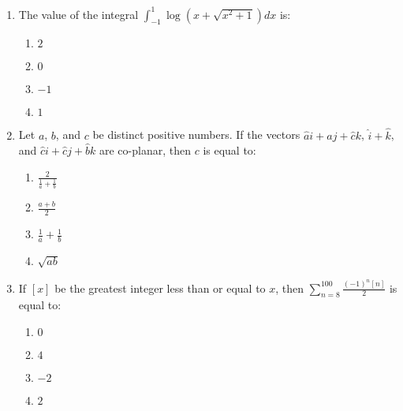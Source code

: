 \documentclass[journal]{IEEEtran}
\newcommand{\brak}[1]{\left( #1 \right)}
\newcommand{\sbrak}[1]{\left[ #1 \right]}
\begin{document}
\begin{enumerate}
        \begin{multicols}{4}
        \begin{enumerate}
        \item $3$
        \item $4$
        \item $2$
        \item $1$
        \end{enumerate}
        \end{multicols}

    \item The value of the integral $\int_{-1}^{1}\log\brak{x+\sqrt{x^2+1}}dx$ is:
    
        \begin{multicols}{4}
        \begin{enumerate}
        \item $2$
        \item $0$
        \item $-1$
        \item $1$
        \end{enumerate}
        \end{multicols}

    \item Let $a$, $b$, and $c$ be distinct positive numbers. If the vectors $\hat{a}i+\hat{a}j+\hat{c}k$, $\hat{i}+\hat{k}$, and $\hat{c}i+\hat{c}j+\hat{b}k$ are co-planar, then $c$ is equal to:

        \begin{multicols}{4}
        \begin{enumerate}
        \item $\frac{2}{\frac{1}{a}+\frac{1}{b}}$
        \item $\frac{a+b}{2}$
        \item $\frac{1}{a}+\frac{1}{b}$
        \item $\sqrt{ab}$
        \end{enumerate}
        \end{multicols}

    \item If $\sbrak{x}$ be the greatest integer less than or equal to $x$, then $\sum_{n=8}^{100}\frac{\brak{-1}^n\sbrak{n}}{2}$ is equal to:

        \begin{multicols}{4}
        \begin{enumerate}
        \item $0$
        \item $4$
        \item $-2$
        \item $2$
        \end{enumerate}
        \end{multicols}


\end{enumerate}
\end{document}
